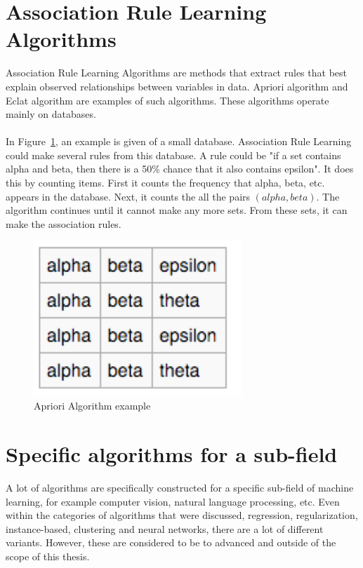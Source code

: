 \section{Association Rule Learning Algorithms}
Association Rule Learning Algorithms are methods that extract rules that best explain observed relationships between variables in data. Apriori algorithm and Eclat algorithm are examples of such algorithms. These algorithms operate mainly on databases.   \cite{mlcat} \\\\
In Figure~\ref{fig:apriori}, an example is given of a small database. Association Rule Learning could make several rules from this database. A rule could be "if a set contains alpha and beta, then there is a 50\% chance that it also contains epsilon". \cite{apriori} It does this by counting items. First it counts the frequency that alpha, beta, etc. appears in the database. Next, it counts the all the pairs $(alpha, beta)$. The algorithm continues until it cannot make any more sets. From these sets, it can make the association rules. 

\begin{figure}[H]
\centering
\includegraphics[width=0.7\textwidth]{Figures/Apriori}
\decoRule
\caption[Apriori Algorithm example]{Apriori Algorithm example \cite{apriori}}
\label{fig:apriori}
\end{figure}

\section{Specific algorithms for a sub-field}
A lot of algorithms are specifically constructed for a specific sub-field of machine learning, for example computer vision, natural language processing, etc. Even within the categories of algorithms that were discussed, regression, regularization, instance-based, clustering and neural networks, there are a lot of different variants. However, these are considered to be to advanced and outside of the scope of this thesis. 
